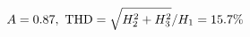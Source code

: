 \documentclass[preview]{standalone}
\begin{document}
\begin{align*}
\special{dvisvgm:raw <g id='unique000'>}A=0.87,\ \text{THD}=\sqrt{H_2^2+H_3^2}/H_1=15.7\%\special{dvisvgm:raw </g>}
\end{align*}
\end{document}
